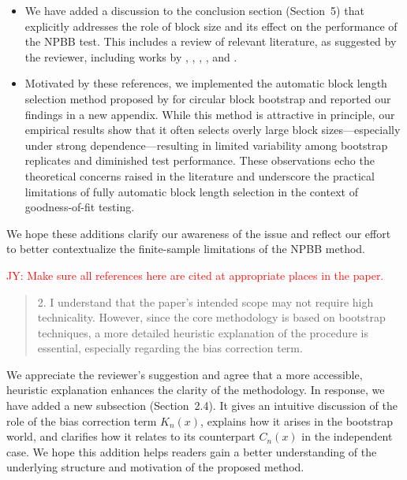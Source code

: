 \documentclass[12pt]{article}
\newcommand{\jy}[1]{\textcolor{red}{JY: #1}}
\newenvironment{comment}%
{\begin{quotation}\noindent\small\it\color{darkblue}\ignorespaces%
}{\end{quotation}}
\begin{document}
\begin{itemize}
\item We have added a discussion to the conclusion section (Section~5) 
that explicitly addresses the role of block size and its effect on the 
performance of the NPBB test. This includes a review of relevant literature, 
as suggested by the reviewer, including works by 
\citet{hall1995blocking}, \citet{lahiri1999theoretical}, 
\citet{buhlmann2002bootstraps}, \citet{politis2004automatic}, and 
\citet{lahiri2013resampling}.

\item Motivated by these references, we implemented the automatic block 
length selection method proposed by \citet{politis2004automatic} for 
circular block bootstrap and reported our findings in a new appendix. 
While this method is attractive in principle, our empirical results show 
that it often selects overly large block sizes---especially under strong 
dependence---resulting in limited variability among bootstrap replicates 
and diminished test performance. These observations echo the theoretical 
concerns raised in the literature and underscore the practical limitations 
of fully automatic block length selection in the context of 
goodness-of-fit testing.
\end{itemize}

We hope these additions clarify our awareness of the issue and reflect 
our effort to better contextualize the finite-sample limitations of the 
NPBB method.


\jy{Make sure all references here are cited at appropriate places in the paper.}


\begin{comment}
2. I understand that the paper’s intended scope may not require high 
technicality. However,
since the core methodology is based on bootstrap techniques, a more detailed 
heuristic
explanation of the procedure is essential, especially regarding the bias 
correction term.
\end{comment}


We appreciate the reviewer’s suggestion and agree that a more accessible, 
heuristic explanation enhances the clarity of the methodology. In response, 
we have added a new subsection (Section~2.4). It gives an intuitive
discussion of the role of the bias correction term $ K_n(x)$, explains
how it arises in the bootstrap world, and clarifies how it relates to
its counterpart $C_n(x)$ in the independent case. We hope this
addition helps readers gain a better understanding of the underlying
structure and motivation of the proposed method.
\end{document}
